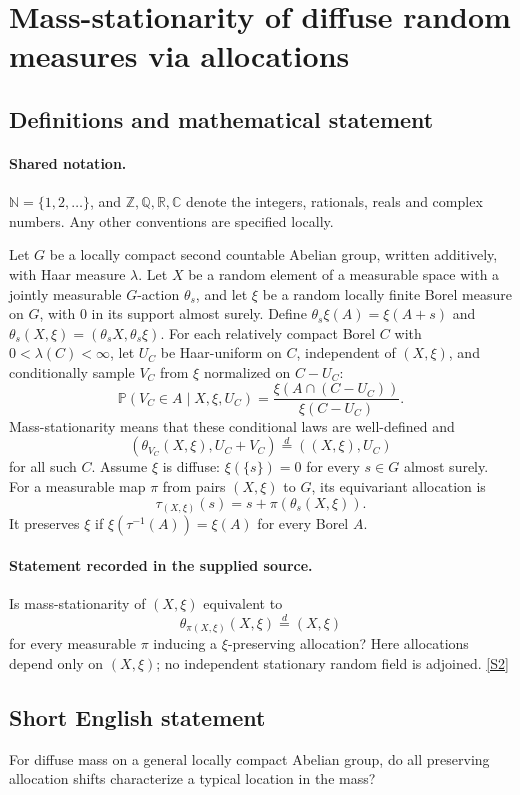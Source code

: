 \documentclass[11pt]{article}
\newcommand{\sref}[2]{\hyperlink{source:#1:#2}{[S#2]}}
\begin{document}
\section{Mass-stationarity of diffuse random measures via allocations}\label{statement}

\subsection{Definitions and mathematical statement}

\paragraph{Shared notation.}$\mathbb N=\{1,2,\ldots\}$, and $\mathbb Z,\mathbb Q,\mathbb R,\mathbb C$ denote the integers, rationals, reals and complex numbers. Any other conventions are specified locally.


Let $G$ be a locally compact second countable Abelian group, written additively, with Haar measure $\lambda$. Let $X$ be a random element of a measurable space with a jointly measurable $G$-action $\theta_s$, and let $\xi$ be a random locally finite Borel measure on $G$, with $0$ in its support almost surely. Define $\theta_s\xi(A)=\xi(A+s)$ and $\theta_s(X,\xi)=(\theta_sX,\theta_s\xi)$. For each relatively compact Borel $C$ with $0<\lambda(C)<\infty$, let $U_C$ be Haar-uniform on $C$, independent of $(X,\xi)$, and conditionally sample $V_C$ from $\xi$ normalized on $C-U_C$:
\[\mathbb P(V_C\in A\mid X,\xi,U_C)=\frac{\xi(A\cap(C-U_C))}{\xi(C-U_C)}.\]
Mass-stationarity means that these conditional laws are well-defined and
\[(\theta_{V_C}(X,\xi),U_C+V_C)\stackrel d=((X,\xi),U_C)\]
for all such $C$. Assume $\xi$ is diffuse: $\xi(\{s\})=0$ for every $s\in G$ almost surely. For a measurable map $\pi$ from pairs $(X,\xi)$ to $G$, its equivariant allocation is
\[\tau_{(X,\xi)}(s)=s+\pi(\theta_s(X,\xi)).\]
It preserves $\xi$ if $\xi(\tau^{-1}(A))=\xi(A)$ for every Borel $A$.
\paragraph{Statement recorded in the supplied source.}
Is mass-stationarity of $(X,\xi)$ equivalent to
\[\theta_{\pi(X,\xi)}(X,\xi)\stackrel d=(X,\xi)\]
for every measurable $\pi$ inducing a $\xi$-preserving allocation? Here allocations depend only on $(X,\xi)$; no independent stationary random field is adjoined. \sref{statement}{2}
\subsection{Short English statement}
For diffuse mass on a general locally compact Abelian group, do all preserving allocation shifts characterize a typical location in the mass?
\end{document}
